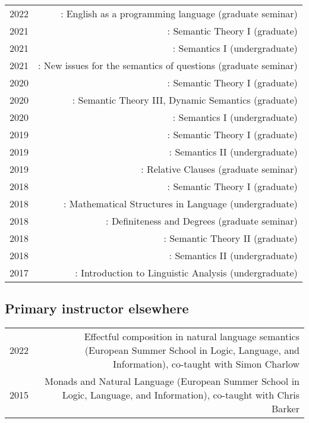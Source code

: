 \documentclass[12pt]{article}
\begin{document}
\begin{longtable}{LR}
  2022 & : English as a programming language (graduate seminar)\\
  2021 & : Semantic Theory I (graduate)\\
  2021 & : Semantics I (undergraduate)\\
  2021 & : New issues for the semantics of questions (graduate seminar)\\
  2020 & : Semantic Theory I (graduate)\\
  2020 & : Semantic Theory III, Dynamic Semantics (graduate)\\
  2020 & : Semantics I (undergraduate)\\
  2019 & : Semantic Theory I (graduate)\\
  2019 & : Semantics II (undergraduate)\\
  2019 & : Relative Clauses (graduate seminar)\\
  2018 & : Semantic Theory I (graduate)\\
  2018 & : Mathematical Structures in Language (undergraduate)\\
  2018 & : Definiteness and Degrees (graduate seminar)\\
  2018 & : Semantic Theory II (graduate)\\
  2018 & : Semantics II (undergraduate)\\
  2017 & : Introduction to Linguistic Analysis (undergraduate)
\end{longtable}

\subsection*{Primary instructor elsewhere}%

\begin{longtable}{LR}
  2022 & Effectful composition in natural language semantics (European Summer
         School in Logic, Language, and Information), co-taught with Simon
         Charlow\\
  2015 & Monads and Natural Language (European Summer School in Logic, Language,
         and Information), co-taught with Chris Barker
\end{longtable}
\end{document}
